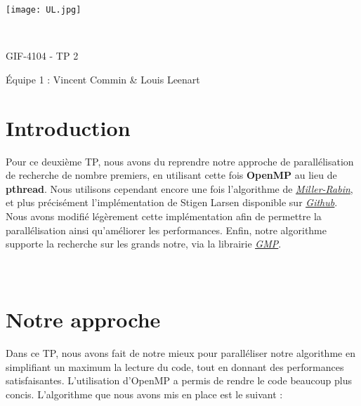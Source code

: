 \documentclass[a4paper, french]{article}
\author{Vincent Commin \& Louis Leenart}
\date{\today}
\begin{document}
\begin{titlepage}
    \begin{flushleft}
        \texttt{[image: UL.jpg]}\par
        \centering
        
        \vspace{13\baselineskip}       
        \HRule \\[0.4cm]

        {\Huge 
        GIF-4104 - TP 2\par}
        \vspace{0.4cm}
        \HRule
        \vfill
        Équipe 1 : Vincent Commin \& Louis Leenart\medskip \par
    \end{flushleft}
\end{titlepage}

\newpage
\section{Introduction}

Pour ce deuxième TP, nous avons du reprendre notre approche de parallélisation de recherche de
nombre premiers, en utilisant cette fois \textbf{OpenMP} au lieu de \textbf{pthread}. Nous utilisons
cependant encore une fois l'algorithme de
\href{https://fr.wikipedia.org/wiki/Test_de_primalit%C3%A9_de_Miller-Rabin}{\textit{\underline{Miller-Rabin}}}, et plus 
précisément l'implémentation de Stigen Larsen disponible sur
\href{https://github.com/cslarsen/miller-rabin}{\textit{\underline{Github}}}. Nous avons modifié
légèrement cette implémentation afin de permettre la parallélisation ainsi qu'améliorer les
performances. Enfin, notre algorithme supporte la recherche sur les grands notre, via la librairie
\href{https://gmplib.org/}{\textit{\underline{GMP}}}. \\\\\\

\section{Notre approche}

Dans ce TP, nous avons fait de notre mieux pour paralléliser notre algorithme en simplifiant un
maximum la lecture du code, tout en donnant des performances satisfaisantes. L'utilisation
d'OpenMP a permis de rendre le code beaucoup plus concis. L'algorithme que nous avons mis en place
est le suivant : 
\end{document}

